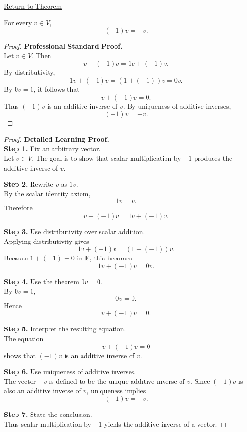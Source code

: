 
\newpage
{}
\label{prf:minus-one-times-vector}

\begin{remark*}[Return]
\hyperref[thm:minus-one-times-vector]{Return to Theorem}
\end{remark*}

\begin{theorem*}[($-1)v=-v$]
For every $v \in V$,
\[
(-1)v=-v.
\]
\end{theorem*}

\begin{proof}
\textbf{Professional Standard Proof.}~\\
Let $v \in V$. Then
\[
v+(-1)v=1v+(-1)v.
\]
By distributivity,
\[
1v+(-1)v=(1+(-1))v=0v.
\]
By \hyperref[thm:zero-scalar-times-vector]{$0v=0$}, it follows that
\[
v+(-1)v=0.
\]
Thus $(-1)v$ is an additive inverse of $v$. By uniqueness of additive inverses,
\[
(-1)v=-v.
\]
\end{proof}

\begin{proof}
\textbf{Detailed Learning Proof.}~\\

\textbf{Step 1.} Fix an arbitrary vector.\\
Let $v \in V$. The goal is to show that scalar multiplication by $-1$ produces the additive inverse of $v$.

\textbf{Step 2.} Rewrite $v$ as $1v$.\\
By the scalar identity axiom,
\[
1v=v.
\]
Therefore
\[
v+(-1)v=1v+(-1)v.
\]

\textbf{Step 3.} Use distributivity over scalar addition.\\
Applying distributivity gives
\[
1v+(-1)v=(1+(-1))v.
\]
Because $1+(-1)=0$ in $\mathbf{F}$, this becomes
\[
1v+(-1)v=0v.
\]

\textbf{Step 4.} Use the theorem $0v=0$.\\
By \hyperref[thm:zero-scalar-times-vector]{$0v=0$},
\[
0v=0.
\]
Hence
\[
v+(-1)v=0.
\]

\textbf{Step 5.} Interpret the resulting equation.\\
The equation
\[
v+(-1)v=0
\]
shows that $(-1)v$ is an additive inverse of $v$.

\textbf{Step 6.} Use uniqueness of additive inverses.\\
The vector $-v$ is defined to be the unique additive inverse of $v$. Since $(-1)v$ is also an additive inverse of $v$, uniqueness implies
\[
(-1)v=-v.
\]

\textbf{Step 7.} State the conclusion.\\
Thus scalar multiplication by $-1$ yields the additive inverse of a vector.
\end{proof}

